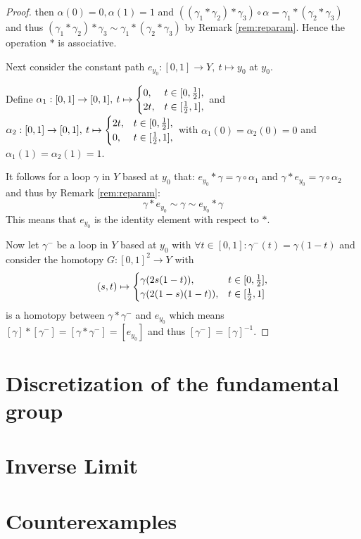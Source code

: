 \documentclass{article}
\theoremstyle{break}
\theoremstyle{break}
\begin{document}
\begin{proof}
  then $\alpha(0) = 0, \alpha(1) = 1$ and $((\gamma_1 * \gamma_2) * \gamma_3) \circ \alpha = \gamma_1 * (\gamma_2 * \gamma_3)$ and thus $(\gamma_1 * \gamma_2) * \gamma_3 \sim \gamma_1 * (\gamma_2 * \gamma_3)$ by Remark \ref{rem:reparam}.
  Hence the operation $*$ is associative.

  Next consider the constant path $e_{y_0}: [0,1] \to Y, \: t \mapsto y_0$ at $y_0$. 
  
  \vspace*{5pt}
  Define $\alpha_1: [0,1] \to [0,1], \: t \mapsto \begin{cases}
    0, &t\in[0, {1\over2}],\\
    2t, &t\in[{1\over2}, 1],
  \end{cases}$ and $\alpha_2: [0,1]\to [0,1], \: t \mapsto \begin{cases}
    2t, &t\in[0, {1\over2}],\\
    0, &t\in[{1\over2}, 1],
  \end{cases}$
  \vspace*{5pt}
  with $\alpha_1(0) = \alpha_2(0) = 0$ and $\alpha_1(1) = \alpha_2(1) = 1$.

  It follows for a loop $\gamma$ in $Y$ based at $y_0$ that: $e_{y_0} * \gamma = \gamma \circ \alpha_1$ and $\gamma * e_{y_0} = \gamma \circ \alpha_2$ and thus by Remark \ref{rem:reparam}:
  \begin{equation*}
    \gamma * e_{y_0} \sim \gamma \sim e_{y_0} * \gamma
  \end{equation*}
  This means that $e_{y_0}$ is the identity element with respect to $*$.

  Now let $\gamma^-$ be a loop in $Y$ based at $y_0$ with $\forall t \in [0,1]: \gamma^-(t) = \gamma(1 - t)$ and consider the homotopy $G: [0,1]^2 \to Y$ with 
  \begin{equation*}
    (s, t) \mapsto \begin{cases}
      \gamma(2s(1-t)), &t \in [0, {1\over2}], \\
      \gamma(2(1-s)(1-t)), &t \in [{1\over2}, 1] 
    \end{cases}
  \end{equation*}
  is a homotopy between $\gamma * \gamma^-$ and $e_{y_0}$ which means $[\gamma] * [\gamma^-] = [\gamma * \gamma^-] = [e_{y_0}]$ and thus $[\gamma^-] = [\gamma]^{-1}$. 
\end{proof}

\section{Discretization of the fundamental group}

\section{Inverse Limit}

\section{Counterexamples}

\clearpage

\end{document}
